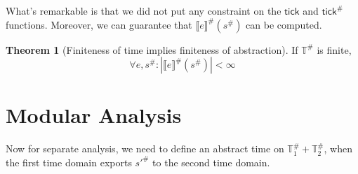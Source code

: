 \documentclass[acmsmall,screen,review]{acmart}
\theoremstyle{definition}
\newtheorem{thm}{Theorem}[section]
\newcommand*{\A}[1]{{#1}^{\#}}
\newcommand*{\Time}{\mathbb{T}}
\newcommand*{\ATime}{\A{\Time}}
\newcommand*{\sembracket}[1]{\lBrack{#1}\rBrack}
\newcommand*{\tick}{\mathsf{tick}}
\begin{document}
What's remarkable is that we did not put any constraint on the $\tick$ and $\A{\tick}$ functions.
Moreover, we can guarantee that $\A{\sembracket{e}}(\A{s})$ can be computed.

\begin{thm}[Finiteness of time implies finiteness of abstraction]
  If $\ATime$ is finite,
  \[
    \forall e,\A{s}: |\A{\sembracket{e}}(\A{s})|<\infty
  \]
\end{thm}

\section{Modular Analysis}
Now for separate analysis, we need to define an abstract time on $\ATime_1+\ATime_2$, when the first time domain exports $\A{s'}$ to the second time domain.
\end{document}
